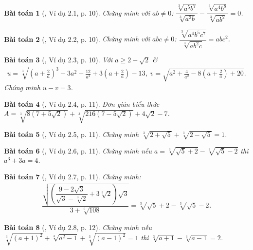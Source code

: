 \documentclass{article}
\newtheorem{baitoan}{Bài toán}
\begin{document}
\begin{baitoan}[\cite{TLCT_THCS_Toan_9_dai_so}, Ví dụ 2.1, p. 10]
	Chứng minh với $ab\ne0$: $\dfrac{\sqrt[3]{a^5b^7}}{\sqrt[3]{a^2b}} - \dfrac{\sqrt[3]{a^4b^8}}{\sqrt[3]{ab^2}} = 0$.
\end{baitoan}

\begin{baitoan}[\cite{TLCT_THCS_Toan_9_dai_so}, Ví dụ 2.2, p. 10]
	Chứng minh với $abc\ne0$: $\dfrac{\sqrt[3]{a^4b^5c^7}}{\sqrt[3]{ab^2c}} = abc^2$.
\end{baitoan}

\begin{baitoan}[\cite{TLCT_THCS_Toan_9_dai_so}, Ví dụ 2.3, p. 10]
	Với $a\ge2 + \sqrt{2}$ \&
	\begin{align*}
		u = \sqrt[3]{\left(a + \frac{2}{a}\right)^3 - 3a^2 - \frac{12}{a^2} + 3\left(a + \frac{2}{a}\right) - 13},\ v = \sqrt{a^2 + \frac{4}{a^2} - 8\left(a + \frac{2}{a}\right) + 20}.
	\end{align*}
	Chứng minh $u - v = 3$.
\end{baitoan}

\begin{baitoan}[\cite{TLCT_THCS_Toan_9_dai_so}, Ví dụ 2.4, p. 11]
	Đơn giản biểu thức $A = \sqrt[3]{8(7 + 5\sqrt{2})} + \sqrt[3]{216(7 - 5\sqrt{2})} + 4\sqrt{2} - 7$.
\end{baitoan}

\begin{baitoan}[\cite{TLCT_THCS_Toan_9_dai_so}, Ví dụ 2.5, p. 11]
	Chứng minh $\sqrt[3]{2 + \sqrt{5}} + \sqrt[3]{2 - \sqrt{5}} = 1$.
\end{baitoan}

\begin{baitoan}[\cite{TLCT_THCS_Toan_9_dai_so}, Ví dụ 2.6, p. 11]
	Chứng minh nếu $a = \sqrt[3]{\sqrt{5} + 2} - \sqrt[3]{\sqrt{5} - 2}$ thì $a^3 + 3a = 4$.
\end{baitoan}

\begin{baitoan}[\cite{TLCT_THCS_Toan_9_dai_so}, Ví dụ 2.7, p. 11]
	Chứng minh:
	\begin{align*}
		\dfrac{\sqrt{\left(\dfrac{9 - 2\sqrt{3}}{\sqrt{3} - \sqrt[3]{2}} + 3\sqrt[3]{2}\right)\sqrt{3}}}{3 + \sqrt[6]{108}} = \sqrt[3]{\sqrt{5} + 2} - \sqrt[3]{\sqrt{5} - 2}.
	\end{align*}
\end{baitoan}

\begin{baitoan}[\cite{TLCT_THCS_Toan_9_dai_so}, Ví dụ 2.8, p. 12]
	Chứng minh nếu $\sqrt[3]{(a + 1)^2} + \sqrt[3]{a^2 - 1} + \sqrt[3]{(a - 1)^2} = 1$ thì $\sqrt[3]{a + 1} - \sqrt[3]{a - 1} = 2$.
\end{baitoan}
\end{document}
